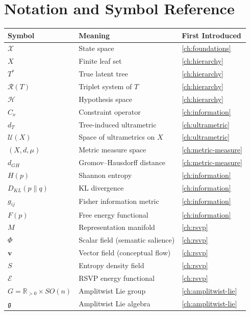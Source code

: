 \documentclass[12pt,a4paper,oneside]{book}
\numberwithin{equation}{chapter}
\theoremstyle{plain}
\theoremstyle{definition}
\theoremstyle{remark}
\begin{document}
\appendix

\chapter{Notation and Symbol Reference}

\begin{center}
\renewcommand{\arraystretch}{1.2}
\begin{tabular}{lll}
\hline
Symbol & Meaning & First Introduced \\
\hline
$\mathcal{X}$ & State space & \cref{ch:foundations} \\
$X$ & Finite leaf set & \cref{ch:hierarchy} \\
$T^\ast$ & True latent tree & \cref{ch:hierarchy} \\
$\mathcal{R}(T)$ & Triplet system of $T$ & \cref{ch:hierarchy} \\
$\mathcal{H}$ & Hypothesis space & \cref{ch:hierarchy} \\
$C_o$ & Constraint operator & \cref{ch:information} \\
$d_T$ & Tree-induced ultrametric & \cref{ch:ultrametric} \\
$\mathcal{U}(X)$ & Space of ultrametrics on $X$ & \cref{ch:ultrametric} \\
$(X,d,\mu)$ & Metric measure space & \cref{ch:metric-measure} \\
$d_{GH}$ & Gromov--Hausdorff distance & \cref{ch:metric-measure} \\
$H(p)$ & Shannon entropy & \cref{ch:information} \\
$D_{KL}(p\|q)$ & KL divergence & \cref{ch:information} \\
$g_{ij}$ & Fisher information metric & \cref{ch:information} \\
$F(p)$ & Free energy functional & \cref{ch:information} \\
$M$ & Representation manifold & \cref{ch:rsvp} \\
$\Phi$ & Scalar field (semantic salience) & \cref{ch:rsvp} \\
$\mathbf{v}$ & Vector field (conceptual flow) & \cref{ch:rsvp} \\
$S$ & Entropy density field & \cref{ch:rsvp} \\
$\mathcal{E}$ & RSVP energy functional & \cref{ch:rsvp} \\
$G = \mathbb{R}_{>0}\times SO(n)$ & Amplitwist Lie group & \cref{ch:amplitwist-lie} \\
$\mathfrak{g}$ & Amplitwist Lie algebra & \cref{ch:amplitwist-lie} \\

\end{tabular}
\end{center}
\end{document}
